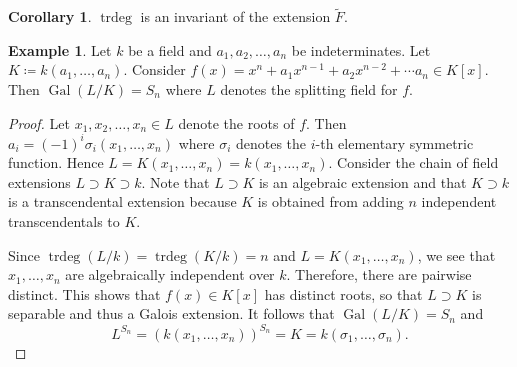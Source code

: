 \documentclass[10pt,letterpaper,cm]{nupset}
\theoremstyle{definition}
\newtheorem{exmp}[definition]{Example}
\theoremstyle{theorem}
\newtheorem{corollary}[definition]{Corollary}
\theoremstyle{remark}
\newcommand{\1}{\mathbf{1}}
\newcommand{\0}{\vec 0}
\DeclareMathOperator{\gal}{Gal}
\DeclareMathOperator{\trdeg}{trdeg}
\begin{document}
\begin{corollary}
$\trdeg$ is an invariant of the extension $\widetilde{F}$.
\end{corollary}

\begin{exmp}
Let $k$ be a field and $a_1, a_2, \ldots, a_n$ be indeterminates.  Let $K\coloneqq  k(a_1, \ldots, a_n)$. Consider $f(x) = x^n + a_1x^{n-1} + a_2x^{n-2} + \cdots a_n \in K[x]$. Then $\gal(L/K) = S_n$ where $L$ denotes the splitting field for $f$.
\end{exmp}
\begin{proof}
Let $x_1, x_2, \ldots, x_n \in L$ denote the roots of $f$. Then $a_i = \left({-1}\right)^i\sigma_i(x_1, \ldots, x_n)$ where $\sigma_i$ denotes the $i$-th elementary symmetric function. Hence $L = K(x_1, \ldots, x_n) = k(x_1, \ldots, x_n)$. Consider the chain of field extensions $L \supset K \supset k$. Note that $L \supset K$ is an algebraic extension and that $K \supset k$ is a transcendental extension because $K$ is obtained from adding $n$ independent transcendentals to $K$.

\medskip

 
Since $\trdeg(L/k) = \trdeg(K/k) = n$ and $L = K(x_1, \ldots, x_n)$, we see that $x_1, \ldots, x_n$ are algebraically independent over $k$.  Therefore, there are pairwise distinct. This shows that $f(x) \in K[x]$ has distinct roots, so that $L\supset K$ is separable and thus a Galois extension. It follows that $\gal(L/K) = S_n$ and $$L^{S_n}= \left(k(x_1, \ldots, x_n)\right)^{S_n}= K =k(\sigma_1, \ldots, \sigma_n).$$
\end{proof}
\end{document}
